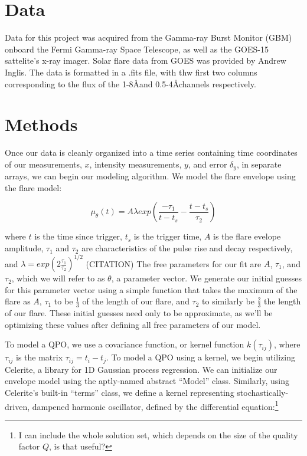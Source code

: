\documentclass{aastex61}
\begin{document}
\section{Data} \label{sec:data}
Data for this project was acquired from the Gamma-ray Burst Monitor (GBM) onboard the Fermi Gamma-ray Space Telescope, as well as the GOES-15 sattelite's x-ray imager.
Solar flare data from GOES  was provided by Andrew Inglis.
The data is formatted in a .fits file, with thw first two columns corresponding to the flux of the 1-8\AA and 0.5-4\AA channels respectively.



\section{Methods} \label{sec:methods}
Once our data is cleanly organized into a time series containing time coordinates of our measurements, $x$, intensity measurements, $y$, and error $\delta_y$, in separate arrays, we can begin our modeling algorithm. We model the flare envelope using the flare model:

\begin{equation}
	\mu_{\theta}(t) = A \lambda exp{\left( \frac{-\tau_1}{t-t_s}-\frac{t-t_s}{\tau_2}\right)}
	\label{model}
\end{equation}

where $t$ is the time since trigger, $t_s$ is the trigger time, $A$ is the flare evelope amplitude, $\tau_1$ and $\tau_2$ are characteristics of the pulse rise and decay respectively, and 
$\lambda = exp(2\frac{\tau_1}{\tau_2})^{1/2}$ (CITATION)
The free parameters for our fit are $A$, $\tau_1$, and $\tau_2$, which we will refer to as $\theta$, a parameter vector.
We generate our initial guesses for this parameter vector using a simple function that takes the maximum of the flare as $A$, $\tau_1$ to be $\frac{1}{3}$ of the length of our flare, and $\tau_2$ to similarly be $\frac{2}{3}$ the length of our flare.
These initial guesses need only to be approximate, as we'll be optimizing these values after defining all free parameters of our model.

To model a QPO, we use a covariance function, or kernel function $k(\tau_{ij})$, where $\tau_{ij}$ is the matrix $\tau_{ij} = t_i-t_j$. To model a QPO using a kernel, we begin utilizing Celerite, a library for 1D Gaussian process regression. We can initialize our envelope model using the aptly-named abstract ``Model'' class.
Similarly, using Celerite's built-in ``terms'' class, we define a kernel representing stochastically-driven, dampened harmonic oscillator, defined by the differential equation:\footnote{I can include the whole solution set, which depends on the size of the quality factor $Q$, is that useful?}
\end{document}

